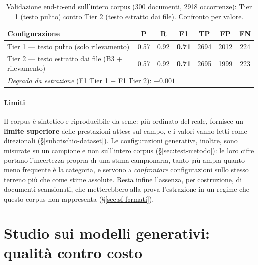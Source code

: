 \begin{table}
	\centering
	\caption{Validazione end-to-end sull'intero corpus (300 documenti, 2918 occorrenze): Tier 1 (testo pulito) contro Tier 2 (testo estratto dai file). Confronto per valore.}
	\label{tab:test-estrazione}
	\small
	\begin{tabular}{|l|c|c|c|c|c|c|}
		\hline
		\textbf{Configurazione}                               & \textbf{P} & \textbf{R} & \textbf{F1}   & \textbf{TP} & \textbf{FP} & \textbf{FN} \\
		\hline
		Tier 1 --- testo pulito (solo rilevamento)            & 0.57       & 0.92       & \textbf{0.71} & 2694        & 2012        & 224         \\
		\hline
		Tier 2 --- testo estratto dai file (B3 + rilevamento) & 0.57       & 0.92       & \textbf{0.71} & 2695        & 1999        & 223         \\
		\hline
		\multicolumn{7}{|l|}{\textit{Degrado da estrazione} (F1 Tier 1 $-$ F1 Tier 2): $-0.001$}                                                  \\
		\hline
	\end{tabular}
\end{table}

\paragraph*{Limiti} Il corpus è sintetico e riproducibile da seme: più ordinato del reale, fornisce un \textbf{limite superiore} delle prestazioni attese sul campo, e i valori vanno letti come direzionali (§\ref{sub:rischio-dataset}). Le configurazioni generative, inoltre, sono misurate su un campione e non sull'intero corpus (§\ref{sec:test-metodo}): le loro cifre portano l'incertezza propria di una stima campionaria, tanto più ampia quanto meno frequente è la categoria, e servono a \emph{confrontare} configurazioni sullo stesso terreno più che come stime assolute. Resta infine l'assenza, per costruzione, di documenti scansionati, che metterebbero alla prova l'estrazione in un regime che questo corpus non rappresenta (§\ref{sec:sf-formati}).

\section{Studio sui modelli generativi: qualità contro costo}
\label{sec:test-ai-multimodello}

